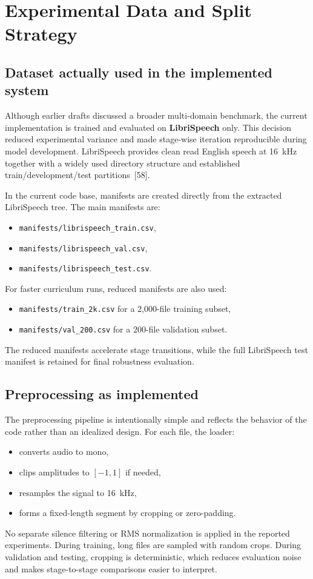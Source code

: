 \section{Experimental Data and Split Strategy}
\subsection{Dataset actually used in the implemented system}
Although earlier drafts discussed a broader multi-domain benchmark, the current implementation is trained and evaluated on \textbf{LibriSpeech} only. This decision reduced experimental variance and made stage-wise iteration reproducible during model development. LibriSpeech provides clean read English speech at 16~kHz together with a widely used directory structure and established train/development/test partitions~[58].

In the current code base, manifests are created directly from the extracted LibriSpeech tree. The main manifests are:
\begin{itemize}[leftmargin=1.25em]
  \item \texttt{manifests/librispeech\_train.csv},
  \item \texttt{manifests/librispeech\_val.csv},
  \item \texttt{manifests/librispeech\_test.csv}.
\end{itemize}
For faster curriculum runs, reduced manifests are also used:
\begin{itemize}[leftmargin=1.25em]
  \item \texttt{manifests/train\_2k.csv} for a 2,000-file training subset,
  \item \texttt{manifests/val\_200.csv} for a 200-file validation subset.
\end{itemize}
The reduced manifests accelerate stage transitions, while the full LibriSpeech test manifest is retained for final robustness evaluation.

\subsection{Preprocessing as implemented}
The preprocessing pipeline is intentionally simple and reflects the behavior of the code rather than an idealized design. For each file, the loader:
\begin{itemize}[leftmargin=1.25em]
  \item converts audio to mono,
  \item clips amplitudes to $[-1,1]$ if needed,
  \item resamples the signal to 16~kHz,
  \item forms a fixed-length segment by cropping or zero-padding.
\end{itemize}
No separate silence filtering or RMS normalization is applied in the reported experiments. During training, long files are sampled with random crops. During validation and testing, cropping is deterministic, which reduces evaluation noise and makes stage-to-stage comparisons easier to interpret.

